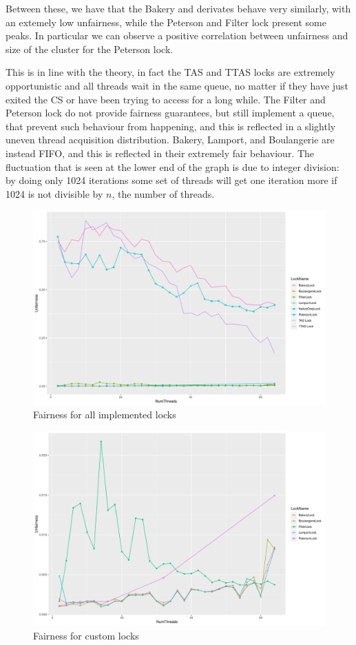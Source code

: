 Between these, we have that the Bakery and derivates behave very similarly, with
an extemely low unfairness, while the Peterson and Filter lock present some peaks.
In particular we can observe a positive correlation between unfairness and size of
the cluster for the Peterson lock.

This is in line with the theory, in fact the TAS and TTAS locks are extremely
opportunistic and all threads wait in the same queue, no matter if they have
just exited the CS or have been trying to access for a long while.
The Filter and Peterson lock do not provide fairness guarantees, but still
implement a queue, that prevent such behaviour from happening, and this is
reflected in a slightly uneven thread acquisition distribution.
Bakery, Lamport, and Boulangerie are instead FIFO, and this is reflected in
their extremely fair behaviour. The fluctuation that is seen at the lower end
of the graph is due to integer division: by doing only 1024 iterations some
set of threads will get one iteration more if 1024 is not divisible by $n$, the 
number of threads.

\begin{figure}[H]
  \includegraphics[width=\textwidth]{fig/fairness_all}
  \caption{Fairness for all implemented locks}
  \label{fig:fairness-all}
\end{figure}

\begin{figure}[H]
  \includegraphics[width=\textwidth]{fig/fairness_no_tas}
  \caption{Fairness for custom locks}
  \label{fig:fairness-no-tas}
\end{figure}
